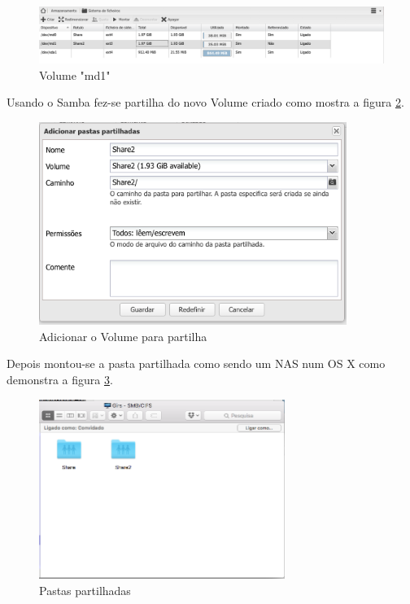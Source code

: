 \documentclass[pdftex,12pt,a4paper]{report}
\begin{document}
\begin{figure}[!htb]
\center
 \includegraphics[width=150mm,scale=1]{imagens/FileSystem.png}
 \caption{Volume "md1"}
 \label{fig:exemploraid}
\end{figure}

Usando o Samba fez-se partilha do novo Volume criado como mostra a figura \ref{fig:SharedFolders}.

\begin{figure}[!htb]
\center
 \includegraphics[width=100mm,scale=1]{imagens/AddShare2.png}
 \caption{Adicionar o Volume para partilha}
 \label{fig:SharedFolders}
\end{figure}

Depois montou-se a pasta partilhada como sendo um NAS num OS X como demonstra a figura \ref{fig:MacSharedFolders}.

\begin{figure}[!htb]
\center
 \includegraphics[width=80mm,scale=1]{imagens/MacSharedFolders.png}
 \caption{Pastas partilhadas}
 \label{fig:MacSharedFolders}
\end{figure}
\end{document}
